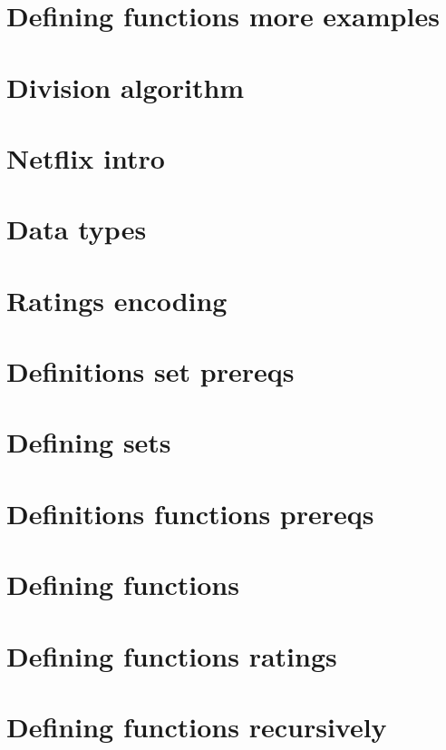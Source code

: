 
\section*{Defining functions more examples}

\vfill
\section*{Division algorithm}

\vfill
\section*{Netflix intro}

\vfill
\section*{Data types}

\vfill
\section*{Ratings encoding}

\vfill
\section*{Definitions set prereqs}

\vfill
\section*{Defining sets}

\vfill
\section*{Definitions functions prereqs}

\vfill
\section*{Defining functions}

\vfill
\section*{Defining functions ratings}

\vfill
\section*{Defining functions recursively}

\vfill
